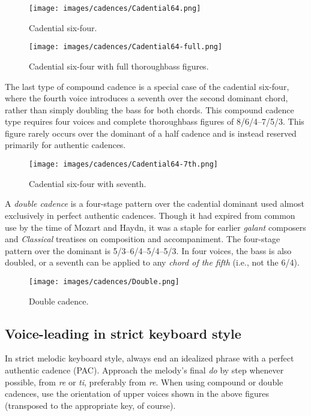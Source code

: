 \documentclass{book}
\begin{document}
\begin{figure}
\centering
\texttt{[image: images/cadences/Cadential64.png]}
\caption{Cadential six-four.}
\end{figure}

\begin{figure}
\centering
\texttt{[image: images/cadences/Cadential64-full.png]}
\caption{Cadential six-four with full thoroughbass figures.}
\end{figure}

The last type of compound cadence is a special case of the cadential six-four,
where the fourth voice introduces a seventh over the second dominant chord,
rather than simply doubling the bass for both chords. This compound cadence
type requires four voices and complete thoroughbass figures of 8/6/4--7/5/3.
This figure rarely occurs over the dominant of a half cadence and is instead
reserved primarily for authentic cadences.

\begin{figure}
\centering
\texttt{[image: images/cadences/Cadential64-7th.png]}
\caption{Cadential six-four with seventh.}
\end{figure}

A \emph{double cadence} is a four-stage pattern over the cadential dominant
used almost exclusively in perfect authentic cadences. Though it had expired
from common use by the time of Mozart and Haydn, it was a staple for earlier
\emph{galant} composers and \emph{Classical} treatises on composition and
accompaniment. The four-stage pattern over the dominant is 5/3--6/4--5/4--5/3.
In four voices, the bass is also doubled, or a seventh can be applied to any
\emph{chord of the fifth} (i.e., not the 6/4).

\begin{figure}
\centering
\texttt{[image: images/cadences/Double.png]}
\caption{Double cadence.}
\end{figure}

\hypertarget{voice-leading-in-strict-keyboard-style}{%
\subsection{Voice-leading in strict keyboard
style}\label{voice-leading-in-strict-keyboard-style}}

In strict melodic keyboard style, always end an idealized phrase with a
perfect authentic cadence (PAC). Approach the melody's final \emph{do} by step
whenever possible, from \emph{re} or \emph{ti}, preferably from \emph{re}.
When using compound or double cadences, use the orientation of upper voices
shown in the above figures (transposed to the appropriate key, of course).
\end{document}

